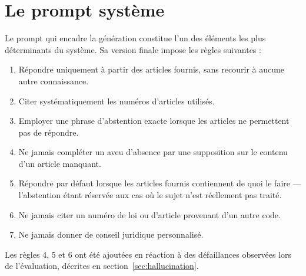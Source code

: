 \section{Le prompt système}

Le prompt qui encadre la génération constitue l'un des éléments les plus déterminants du système.
Sa version finale impose les règles suivantes :

\begin{enumerate}
    \item Répondre uniquement à partir des articles fournis, sans recourir à aucune autre
    connaissance.
    \item Citer systématiquement les numéros d'articles utilisés.
    \item Employer une phrase d'abstention exacte lorsque les articles ne permettent pas de
    répondre.
    \item Ne jamais compléter un aveu d'absence par une supposition sur le contenu d'un article
    manquant.
    \item Répondre par défaut lorsque les articles fournis contiennent de quoi le faire ---
    l'abstention étant réservée aux cas où le sujet n'est réellement pas traité.
    \item Ne jamais citer un numéro de loi ou d'article provenant d'un autre code.
    \item Ne jamais donner de conseil juridique personnalisé.
\end{enumerate}

Les règles 4, 5 et 6 ont été ajoutées en réaction à des défaillances observées lors de
l'évaluation, décrites en section~\ref{sec:hallucination}.


